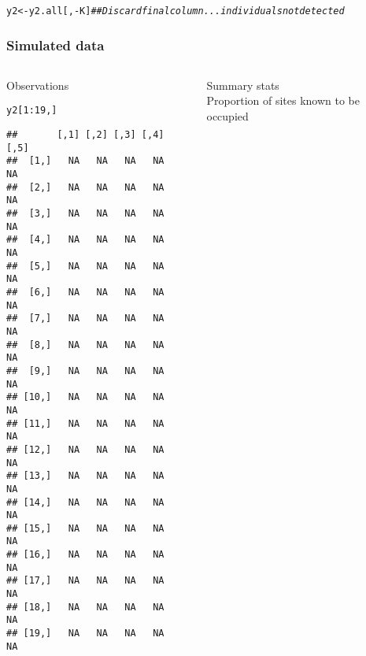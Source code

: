 \documentclass[color=usenames,dvipsnames]{beamer}\usepackage[]{graphicx}\usepackage[]{color}
\makeatletter
\newcommand{\hlnum}[1]{\textcolor[rgb]{0.69,0.494,0}{#1}}%
\newcommand{\hlcom}[1]{\textcolor[rgb]{0.514,0.506,0.514}{\textit{#1}}}%
\newcommand{\hlopt}[1]{\textcolor[rgb]{0,0,0}{#1}}%
\newcommand{\hlstd}[1]{\textcolor[rgb]{0,0,0}{#1}}%
\newcommand{\hlkwb}[1]{\textcolor[rgb]{0,0.341,0.682}{#1}}%
\newenvironment{kframe}{%
 \def\at@end@of@kframe{}%
 \ifinner\ifhmode%
  \def\at@end@of@kframe{\end{minipage}}%
  \begin{minipage}{\columnwidth}%
 \fi\fi%
 \def\FrameCommand##1{\hskip\@totalleftmargin \hskip-\fboxsep
 \colorbox{shadecolor}{##1}\hskip-\fboxsep
     \hskip-\linewidth \hskip-\@totalleftmargin \hskip\columnwidth}%
 \MakeFramed {\advance\hsize-\width
   \@totalleftmargin\z@ \linewidth\hsize
   \@setminipage}}%
 {\par\unskip\endMakeFramed%
 \at@end@of@kframe}
\newenvironment{knitrout}{}{} %
\makeatother
\begin{document}
\begin{frame}[fragile]
\begin{knitrout}
\begin{kframe}
{\ttfamily\noindent\bfseries\color{errorcolor}{\#\# Error in y2.all[i, ] <- rmultinom(n = 1, size = N2[i], prob = pi2[i, ]): number of items to replace is not a multiple of replacement length}}\begin{alltt}
\hlstd{y2} \hlkwb{<-} \hlstd{y2.all[,}\hlopt{-}\hlstd{K]} \hlcom{## Discard final column... individuals not detected}
\end{alltt}
\end{kframe}
\end{knitrout}
\end{frame}




\begin{frame}[fragile]
  \frametitle{Simulated data}
  \begin{columns}
    \begin{column}{0.4\textwidth}
      \small
      Observations
  \vspace{-6pt}
\begin{knitrout}\scriptsize
{}\color{fgcolor}\begin{kframe}
\begin{alltt}
\hlstd{y2[}\hlnum{1}\hlopt{:}\hlnum{19}\hlstd{,]}
\end{alltt}
\begin{verbatim}
##       [,1] [,2] [,3] [,4] [,5]
##  [1,]   NA   NA   NA   NA   NA
##  [2,]   NA   NA   NA   NA   NA
##  [3,]   NA   NA   NA   NA   NA
##  [4,]   NA   NA   NA   NA   NA
##  [5,]   NA   NA   NA   NA   NA
##  [6,]   NA   NA   NA   NA   NA
##  [7,]   NA   NA   NA   NA   NA
##  [8,]   NA   NA   NA   NA   NA
##  [9,]   NA   NA   NA   NA   NA
## [10,]   NA   NA   NA   NA   NA
## [11,]   NA   NA   NA   NA   NA
## [12,]   NA   NA   NA   NA   NA
## [13,]   NA   NA   NA   NA   NA
## [14,]   NA   NA   NA   NA   NA
## [15,]   NA   NA   NA   NA   NA
## [16,]   NA   NA   NA   NA   NA
## [17,]   NA   NA   NA   NA   NA
## [18,]   NA   NA   NA   NA   NA
## [19,]   NA   NA   NA   NA   NA
\end{verbatim}
\end{kframe}
\end{knitrout}
  \end{column}
  \begin{column}{0.6\textwidth}
    \pause
    {\centering Summary stats \\}
    \vspace{24pt}
    \small
    Proportion of sites known to be occupied

\end{column}
\end{columns}
\end{frame}
\end{document}
